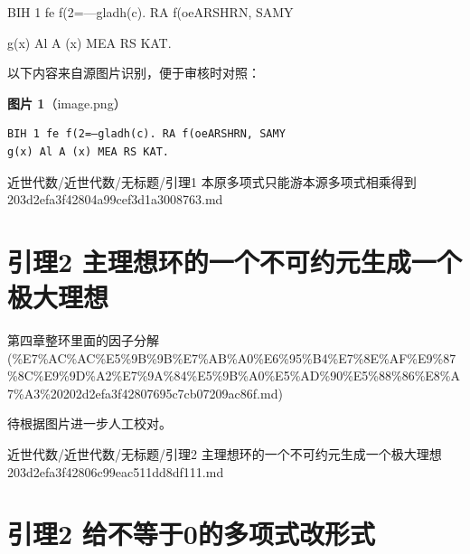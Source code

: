 \begin{lemma}[引理1 本原多项式只能游本源多项式相乘得到]

BIH 1 fe f(2=—gladh(c). RA f(oeARSHRN, SAMY

g(x) Al A (x) MEA RS KAT.

\end{lemma}

\begin{note}
以下内容来自源图片识别，便于审核时对照：

\textbf{图片 1}（image.png）
\begin{Verbatim}[fontsize=\small]
BIH 1 fe f(2=—gladh(c). RA f(oeARSHRN, SAMY
g(x) Al A (x) MEA RS KAT.
\end{Verbatim}

\end{note}

\begin{note}[来源路径]

近世代数/近世代数/无标题/引理1 本原多项式只能游本源多项式相乘得到 203d2efa3f42804a99cef3d1a3008763.md

\end{note}

\section*{引理2 主理想环的一个不可约元生成一个极大理想}

\begin{note}[来源上级主题]

第四章整环里面的因子分解 (\%E7\%AC\%AC\%E5\%9B\%9B\%E7\%AB\%A0\%E6\%95\%B4\%E7\%8E\%AF\%E9\%87\%8C\%E9\%9D\%A2\%E7\%9A\%84\%E5\%9B\%A0\%E5\%AD\%90\%E5\%88\%86\%E8\%A7\%A3\%20202d2efa3f42807695c7cb07209ac86f.md)

\end{note}

\begin{lemma}[引理2 主理想环的一个不可约元生成一个极大理想]

待根据图片进一步人工校对。

\end{lemma}

\begin{note}[来源路径]

近世代数/近世代数/无标题/引理2 主理想环的一个不可约元生成一个极大理想 203d2efa3f42806c99eac511dd8df111.md

\end{note}

\section*{引理2 给不等于0的多项式改形式}

